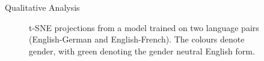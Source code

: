 \documentclass[final]{beamer}
\newlength{\sepwid}
\newlength{\onecolwid}
\begin{document}
\begin{frame}[t]
\begin{columns}[t]
\begin{column}{\onecolwid}
      \begin{block}{Qualitative Analysis}
        \begin{figure}
          \caption{t-SNE projections from a model trained on two language pairs
            (English-German and English-French). The colours denote gender, with
            green denoting the gender neutral English form.}
          \label{fig:ccgrae}
        \end{figure}
      \end{block}

    \end{column} %

  \begin{column}{\sepwid}\end{column} %
  \end{columns} %
\end{frame} %
\end{document}
